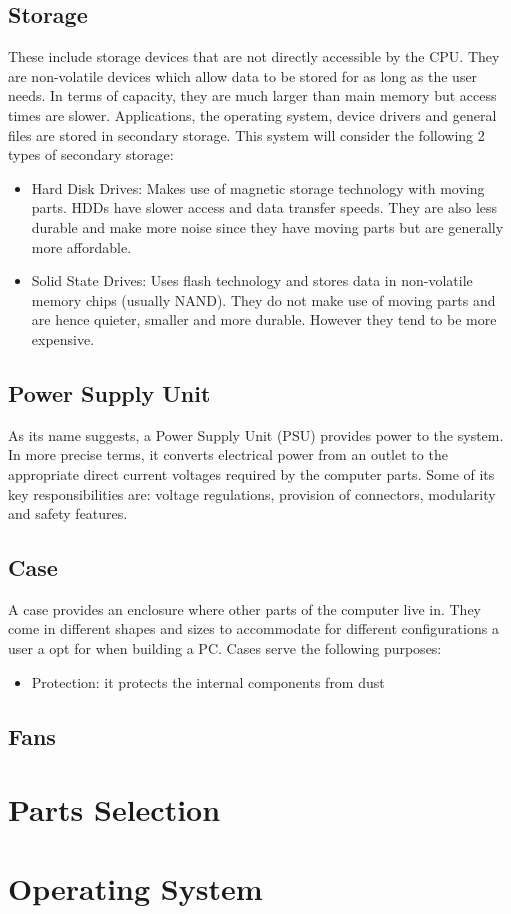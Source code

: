 \documentclass[12pt, a4paper]{article}
\begin{document}
\subsection{Storage}
These include storage devices that are not directly accessible by the CPU.
They are non-volatile devices which allow data to be stored for as long
as the user needs. In terms of capacity, they are much larger than main
memory but access times are slower. Applications, the operating system,
device drivers and general files are stored in secondary storage. This
system will consider the following 2 types of secondary storage:
\begin{itemize}
  \item Hard Disk Drives: Makes use of magnetic storage technology with 
    moving parts. HDDs have slower access and data transfer speeds. They
    are also less durable and make more noise since they have 
    moving parts but are generally more affordable. 
  \item Solid State Drives: Uses flash technology and stores data in 
    non-volatile memory chips (usually NAND). They do not make use
    of moving parts and are hence quieter, smaller and more durable. 
    However they tend to be more expensive.
\end{itemize}

\subsection{Power Supply Unit}
As its name suggests, a Power Supply Unit (PSU) provides power to the 
system. In more precise terms, it converts electrical power from an outlet
to the appropriate direct current voltages required by the computer parts.
Some of its key responsibilities are: voltage regulations, provision
of connectors, modularity and safety features.

\subsection{Case}
A case provides an enclosure where other parts of the computer live in.
They come in different shapes and sizes to accommodate for different
configurations a user a opt for when building a PC. Cases serve the 
following purposes:
\begin{itemize}
  \item Protection: it protects the internal components from dust
  
\end{itemize}

\subsection{Fans}



\section{Parts Selection}



\section{Operating System}

\end{document}
